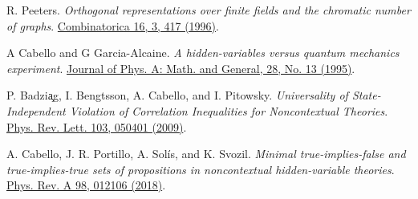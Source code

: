 \documentclass[twocolumn, a4paper, superscriptaddress,nofootinbib, accepted=2020-08-07, hyperref]{quantumarticle}
\def\textbf#1{{\bf #1}}
\begin{document}
\begin{thebibliography}{99}





R. Peeters.
\textit{Orthogonal representations over finite fields and the chromatic number of graphs}. \href{https://doi.org/10.1007/BF01261326}{Combinatorica 16, 3, 417 (1996)}. 

A Cabello and G Garcia-Alcaine. \textit{A hidden-variables versus quantum mechanics experiment}. \href{https://doi.org/10.1088/0305-4470/28/13/016}{Journal of Phys. A: Math. and General, 28, No. 13 (1995)}.

P. Badzi\c{a}g, I. Bengtsson, A. Cabello, and I. Pitowsky. \textit{Universality of State-Independent Violation of Correlation Inequalities for Noncontextual Theories}. \href{https://doi.org/10.1103/PhysRevLett.103.050401}{Phys. Rev. Lett. 103, 050401 (2009)}.

A. Cabello, J. R. Portillo, A. Sol\'{i}s, and K. Svozil. \textit{Minimal true-implies-false and true-implies-true sets of propositions in noncontextual hidden-variable theories}.
\href{https://doi.org/10.1103/PhysRevA.98.012106}{Phys. Rev. A 98, 012106 (2018)}.





\end{thebibliography}
\end{document}

